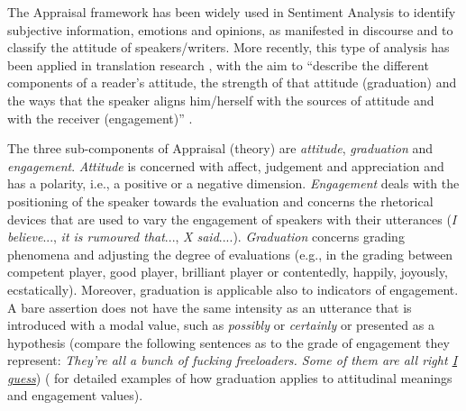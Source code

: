 \documentclass[output=paper]{LSP/langsci}
\begin{document}
The Appraisal framework has been widely used in Sentiment Analysis to identify subjective information, emotions and opinions, as manifested in discourse \citep[see e.g.][]{Whitelaw2005,Taboada2004,Asher2009} and to classify the attitude of speakers/writers. More recently, this type of analysis has been applied in translation research \citep[see the work reported in][42--79]{Munday2012}, with the aim to “describe the different components of a reader's attitude, the strength of that attitude (graduation) and the ways that the speaker aligns him/herself with the sources of attitude and with the receiver (engagement)” \citep[2]{Munday2012}.

The three sub-components of Appraisal (theory) are \textit{attitude}, \textit{graduation} and \textit{engagement}. \textit{Attitude} is concerned with affect, judgement and appreciation and has a polarity, i.e., a positive or a negative dimension. \textit{Engagement} deals with the positioning of the speaker towards the evaluation and concerns the rhetorical devices that are used to vary the engagement of speakers with their utterances (\textit{I believe}..., \textit{it is rumoured that}..., \textit{X said}....). \textit{Graduation} concerns grading phenomena and adjusting the degree of evaluations (e.g., in the grading between competent player, good player, brilliant player or contentedly, happily, joyously, ecstatically). Moreover, graduation is applicable also to indicators of engagement. A bare assertion does not have the same intensity as an utterance that is introduced with a modal value, such as \textit{possibly} or \textit{certainly} or presented as a hypothesis (compare the following sentences as to the grade of engagement they represent: \textit{They're all a bunch of fucking freeloaders. Some of them are all right \ul{I guess}}) (\citealt[see][136]{MartinWhite2005} for detailed examples of how graduation applies to attitudinal meanings and engagement values).
\end{document}
